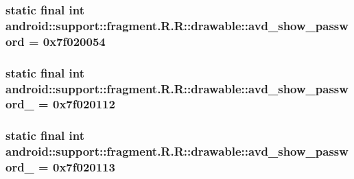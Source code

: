 \hypertarget{classandroid_1_1support_1_1fragment_1_1_r_1_1drawable_9716aaaacf0901abd507bc5218928c0a}{
\subsubsection[{avd\_\-show\_\-password}]{\setlength{\rightskip}{0pt plus 5cm}static final int android::support::fragment.R.R::drawable::avd\_\-show\_\-password = 0x7f020054}}
\label{classandroid_1_1support_1_1fragment_1_1_r_1_1drawable_9716aaaacf0901abd507bc5218928c0a}


\hypertarget{classandroid_1_1support_1_1fragment_1_1_r_1_1drawable_6b047b8d03bc2ac46d7b57d49a5f9d98}{
\subsubsection[{avd\_\-show\_\-password\_\-1}]{\setlength{\rightskip}{0pt plus 5cm}static final int android::support::fragment.R.R::drawable::avd\_\-show\_\-password\_ = 0x7f020112}}
\label{classandroid_1_1support_1_1fragment_1_1_r_1_1drawable_6b047b8d03bc2ac46d7b57d49a5f9d98}


\hypertarget{classandroid_1_1support_1_1fragment_1_1_r_1_1drawable_09a6ebd2aec0599eef757caa52913441}{
\subsubsection[{avd\_\-show\_\-password\_\-2}]{\setlength{\rightskip}{0pt plus 5cm}static final int android::support::fragment.R.R::drawable::avd\_\-show\_\-password\_ = 0x7f020113}}
\label{classandroid_1_1support_1_1fragment_1_1_r_1_1drawable_09a6ebd2aec0599eef757caa52913441}


